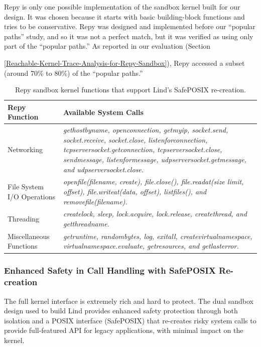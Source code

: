 Repy is only one possible implementation of the sandbox kernel built for our \lip design. 
It was chosen because it starts with basic building-block functions and tries to be conservative. 
Repy was designed and implemented before our ``popular paths'' study, and so it was not a perfect match, 
but it was verified as using only part of the ``popular paths.'' 
As reported in our evaluation (Section~{{\ref{Reachable-Kernel-Trace-Analysis-for-Repy-Sandbox}}), 
Repy accessed a subset (around 70\% to 80\%) of the ``popular paths.'' 

\begin{table}
\centering
  \begin{tabular}{ | p{2.5cm} | p{4.5cm} |}
  \hline
  \textbf{Repy Function} & \textbf{Available System Calls}  \\ \hline

Networking & \emph{gethostbyname, openconnection, getmyip, socket.send, socket.receive, socket.close,
listenforconnection, tcpserversocket.getconnection, tcpserversocket.close, sendmessage, listenformessage,
udpserversocket.getmessage, and udpserversocket.close.} \\ \hline

File System I/O Operations & \emph{openfile(filename, create), file.close(), file.readat(size limit, offset), file.writeat(data, offset),
listfiles(), and removefile(filename).} \\ \hline

Threading & \emph{createlock, sleep, lock.acquire, lock.release, createthread, and getthreadname.} \\ \hline

Miscellaneous Functions & \emph{getruntime, randombytes, log, exitall, createvirtualnamespace,
virtualnamespace.evaluate, getresources, and getlasterror.}  \\ \hline
    \end{tabular}
    \caption{Repy sandbox kernel functions that support Lind's SafePOSIX re-creation.}
    \label{table:RepyKernel}
\end{table}


\subsubsection{Enhanced Safety in Call Handling with SafePOSIX Re-creation}

The full kernel interface is extremely rich and hard to protect.
The dual sandbox \lip design used to build Lind provides enhanced
safety protection through both isolation and a POSIX interface (SafePOSIX) that
re-creates risky system calls to
provide full-featured API for legacy applications, with minimal impact on the kernel.

}
